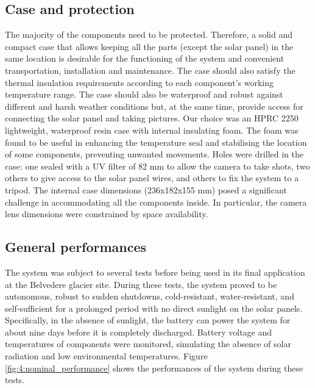 \subsection{Case and protection}\label{Case and protection}
The majority of the components need to be protected. Therefore, a solid and compact case
that allows keeping all the parts (except the solar panel) in the same
location is desirable for the functioning of the system and convenient
transportation, installation and maintenance. The case should also satisfy the thermal
insulation requirements according to each component's working temperature range. The case
should also be waterproof and robust against different and harsh weather conditions but,
at the same time, provide access for connecting the solar panel and taking pictures. Our
choice was an HPRC 2250 lightweight, waterproof resin case with internal insulating foam.
The foam was found to be useful in enhancing the temperature seal and stabilising the
location of some components, preventing unwanted movements. Holes were drilled in the
case: one sealed with a UV filter of 82 mm to allow the camera to take shots, two others
to give access to the solar panel wires, and others to fix the system to a tripod. The
internal case dimensions (236x182x155 mm) posed a significant challenge in accommodating
all the components inside. In particular, the camera lens dimensions were constrained by
space availability.

\subsection{General performances}\label{General_performances}
The system was subject to several tests before being used in its final application at the
Belvedere glacier site. During these tests, the system proved to be autonomous, robust to
sudden shutdowns, cold-resistant, water-resistant, and self-sufficient for a prolonged
period with no direct sunlight on the solar panels. 
Specifically, in the absence of sunlight, the battery can power the system for about nine days before it is completely discharged. 
Battery voltage and temperatures of components were monitored, simulating the absence of solar radiation and low environmental temperatures.
Figure \ref{fig:4:nominal_performance} shows the performances of the system during these tests.

